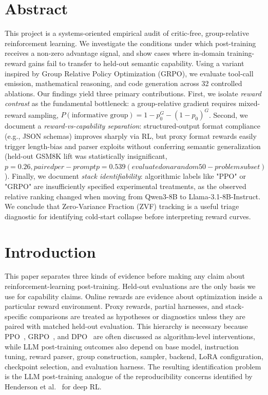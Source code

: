 \documentclass[12pt,a4paper]{report}
\begin{document}
\chapter*{Abstract}
This project is a systems-oriented empirical audit of critic-free, group-relative reinforcement learning. We investigate the conditions under which post-training receives a non-zero advantage signal, and show cases where in-domain training-reward gains fail to transfer to held-out semantic capability. Using a variant inspired by Group Relative Policy Optimization (GRPO), we evaluate tool-call emission, mathematical reasoning, and code generation across 32 controlled ablations. Our findings yield three primary contributions. First, we isolate \textit{reward contrast} as the fundamental bottleneck: a group-relative gradient requires mixed-reward sampling, $P(\text{informative group}) = 1 - p_0^{G} - (1-p_0)^{G}$. Second, we document a \textit{reward-vs-capability separation}: structured-output format compliance (e.g., JSON schemas) improves sharply via RL, but proxy format rewards easily trigger length-bias and parser exploits without conferring semantic generalization (held-out GSM8K lift was statistically insignificant, $p=0.26, paired per-prompt p=0.539 (evaluated on a random 50-problem subset)$). Finally, we document \textit{stack identifiability}: algorithmic labels like "PPO" or "GRPO" are insufficiently specified experimental treatments, as the observed relative ranking changed when moving from Qwen3-8B to Llama-3.1-8B-Instruct. We conclude that Zero-Variance Fraction (ZVF) tracking is a useful triage diagnostic for identifying cold-start collapse before interpreting reward curves.

\tableofcontents
\listoffigures
\listoftables
\clearpage
{}

\chapter{Introduction}
\label{sec:intro}

This paper separates three kinds of evidence before making any claim about
reinforcement-learning post-training.  Held-out evaluations are the only basis
we use for capability claims.  Online rewards are evidence about optimization
inside a particular reward environment.  Proxy rewards, partial harnesses, and
stack-specific comparisons are treated as hypotheses or diagnostics unless they
are paired with matched held-out evaluation.  This hierarchy is necessary
because PPO~\citep{schulman2017ppo}, GRPO~\citep{shao2024deepseekmath},
and DPO~\citep{rafailov2023dpo} are often discussed as algorithm-level
interventions, while LLM post-training outcomes also depend on base model,
instruction tuning, reward parser, group construction, sampler, backend, LoRA
configuration, checkpoint selection, and evaluation harness.  The resulting
identification problem is the LLM post-training analogue of the reproducibility
concerns identified by Henderson et al.~\citep{henderson2018deep} for deep RL.
\end{document}
